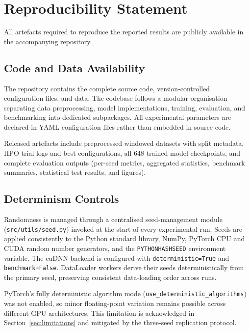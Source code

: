 \section{Reproducibility Statement}
\label{sec:reproducibility}

All artefacts required to reproduce the reported results are publicly available in the accompanying repository.

\subsection{Code and Data Availability}
\label{sec:code_data}

The repository contains the complete source code, version-controlled configuration files, and data.  The codebase follows a modular organisation separating data preprocessing, model implementations, training, evaluation, and benchmarking into dedicated subpackages.  All experimental parameters are declared in YAML configuration files rather than embedded in source code.

Released artefacts include preprocessed windowed datasets with split metadata, HPO trial logs and best configurations, all 648 trained model checkpoints, and complete evaluation outputs (per-seed metrics, aggregated statistics, benchmark summaries, statistical test results, and figures). 
\subsection{Determinism Controls}
\label{sec:determinism}

Randomness is managed through a centralised seed-management module
(\texttt{src/utils/seed.py}) invoked at the start of every experimental run.
Seeds are applied consistently to the Python standard library, NumPy,
PyTorch CPU and CUDA random number generators, and the
\texttt{PYTHONHASHSEED} environment variable.  The cuDNN backend is
configured with \texttt{deterministic=True} and
\texttt{benchmark=False}.  DataLoader workers derive their seeds
deterministically from the primary seed, preserving consistent
data-loading order across runs.

PyTorch's fully deterministic algorithm mode
(\texttt{use\_deterministic\_algorithms})
was not enabled, so minor floating-point variation remains possible
across different GPU architectures.  This limitation is acknowledged
in Section~\ref{sec:limitations} and mitigated by the three-seed
replication protocol.

